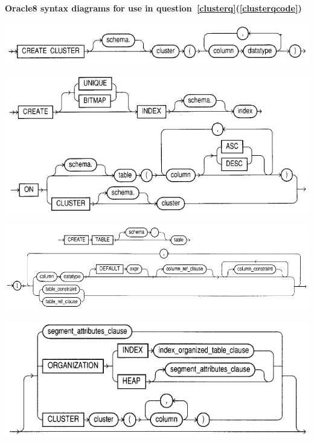 \newpage



\begin{center}
	\textbf{Oracle8 syntax diagrams for use in
	question~\ref{clusterq}(\ref{clusterqcode})}
	
	\bigskip

	\includegraphics{CreateCluster}

	\vfill


	\includegraphics{CreateIndex}


	\vfill

	\includegraphics{CreateTable1}
	
	\bigskip	
	
	\includegraphics{CreateTable2}
\end{center}

